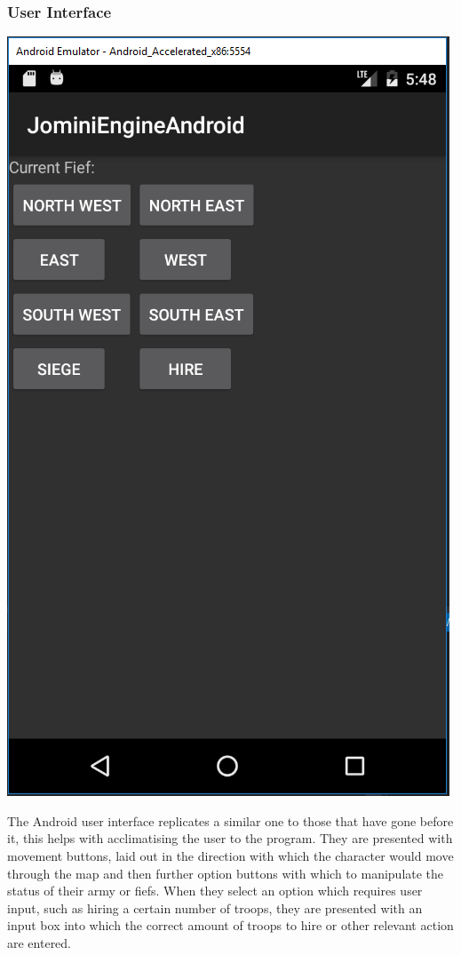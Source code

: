 \documentclass{article}
\begin{document}
\subsubsection{User Interface}
\begin{center}
\includegraphics[scale=0.5]{jominiengine.png}\\
\end{center}
The Android user interface replicates a similar one to those that have gone before it, this helps with acclimatising the user to the program. They are presented with movement buttons, laid out in the direction with which the character would move through the map and then further option buttons with which to manipulate the status of their army or fiefs. When they select an option which requires user input, such as hiring a certain number of troops, they are presented with an input box into which the correct amount of troops to hire or other relevant action are entered.
\end{document}
